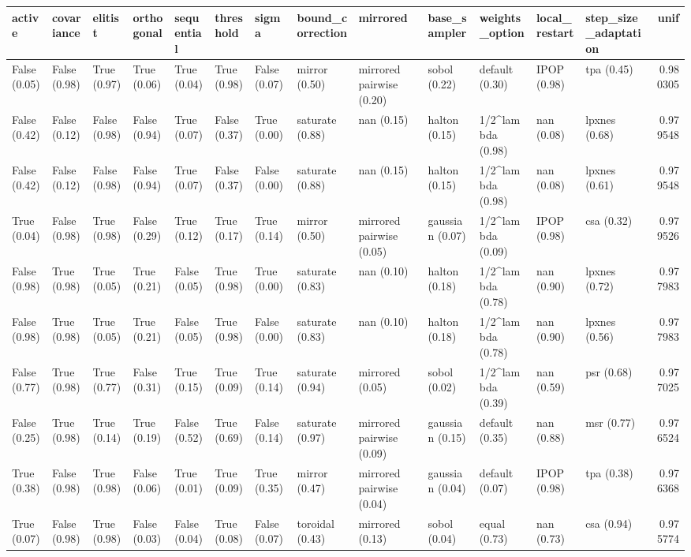\begin{tabular}{lllllllllllllr}
\toprule
active & covariance & elitist & orthogonal & sequential & threshold & sigma & bound_correction & mirrored & base_sampler & weights_option & local_restart & step_size_adaptation & unif \\
\midrule
False (0.05) & False (0.98) & True (0.97) & True (0.06) & True (0.04) & True (0.98) & False (0.07) & mirror (0.50) & mirrored pairwise (0.20) & sobol (0.22) & default (0.30) & IPOP (0.98) & tpa (0.45) & 0.980305 \\
False (0.42) & False (0.12) & False (0.98) & False (0.94) & True (0.07) & False (0.37) & True (0.00) & saturate (0.88) & nan (0.15) & halton (0.15) & 1/2^lambda (0.98) & nan (0.08) & lpxnes (0.68) & 0.979548 \\
False (0.42) & False (0.12) & False (0.98) & False (0.94) & True (0.07) & False (0.37) & False (0.00) & saturate (0.88) & nan (0.15) & halton (0.15) & 1/2^lambda (0.98) & nan (0.08) & lpxnes (0.61) & 0.979548 \\
True (0.04) & False (0.98) & True (0.98) & False (0.29) & True (0.12) & True (0.17) & True (0.14) & mirror (0.50) & mirrored pairwise (0.05) & gaussian (0.07) & 1/2^lambda (0.09) & IPOP (0.98) & csa (0.32) & 0.979526 \\
False (0.98) & True (0.98) & True (0.05) & True (0.21) & False (0.05) & True (0.98) & True (0.00) & saturate (0.83) & nan (0.10) & halton (0.18) & 1/2^lambda (0.78) & nan (0.90) & lpxnes (0.72) & 0.977983 \\
False (0.98) & True (0.98) & True (0.05) & True (0.21) & False (0.05) & True (0.98) & False (0.00) & saturate (0.83) & nan (0.10) & halton (0.18) & 1/2^lambda (0.78) & nan (0.90) & lpxnes (0.56) & 0.977983 \\
False (0.77) & True (0.98) & True (0.77) & False (0.31) & True (0.15) & True (0.09) & True (0.14) & saturate (0.94) & mirrored (0.05) & sobol (0.02) & 1/2^lambda (0.39) & nan (0.59) & psr (0.68) & 0.977025 \\
False (0.25) & True (0.98) & True (0.14) & True (0.19) & False (0.52) & True (0.69) & False (0.14) & saturate (0.97) & mirrored pairwise (0.09) & gaussian (0.15) & default (0.35) & nan (0.88) & msr (0.77) & 0.976524 \\
True (0.38) & False (0.98) & True (0.98) & False (0.06) & True (0.01) & True (0.09) & True (0.35) & mirror (0.47) & mirrored pairwise (0.04) & gaussian (0.04) & default (0.07) & IPOP (0.98) & tpa (0.38) & 0.976368 \\
True (0.07) & False (0.98) & True (0.98) & False (0.03) & False (0.04) & True (0.08) & False (0.07) & toroidal (0.43) & mirrored (0.13) & sobol (0.04) & equal (0.73) & nan (0.73) & csa (0.94) & 0.975774 \\

\end{tabular}
